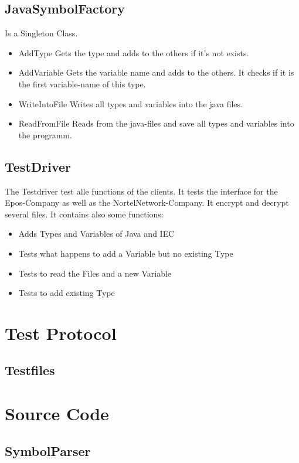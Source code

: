 \subsection{JavaSymbolFactory}
Is a Singleton Class.
\begin{itemize}
	\item AddType
	\subitem Gets the type and adds to the others if it's not exists.
	\item AddVariable
	\subitem Gets the variable name and adds to the others. It checks if it is the first variable-name of this type.
	\item WriteIntoFile
	\subitem Writes all types and variables into the java files.
	\item ReadFromFile
	 \subitem Reads from the java-files and save all types and variables into the programm.
\end{itemize}

\subsection{TestDriver}
The Testdriver test alle functions of the clients. It tests the interface for the Epos-Company as well as the NortelNetwork-Company. It encrypt and decrypt several files. It contains also some functions:
\begin{itemize}
	\item Adds Types and Variables of Java and IEC
	\item Tests what happens to add a Variable but no existing Type
	\item Tests to read the Files and a new Variable
	\item Tests to add existing Type 
\end{itemize}

\newpage
\section{Test Protocol}

\subsection{Testfiles}


\newpage
\section{Source Code}

\subsection{SymbolParser}
